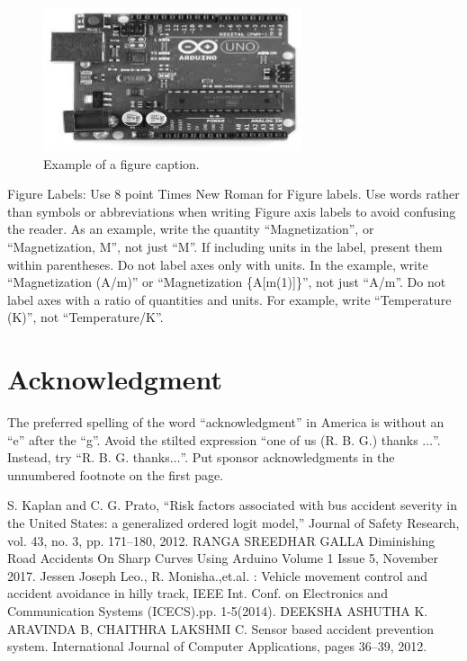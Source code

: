 \documentclass[conference]{IEEEtran}
\begin{document}
    \begin{figure}[htbp]
        \centerline{\includegraphics{arduiono-uno}}
        \caption{Example of a figure caption.}
        \label{fig}
    \end{figure}

    Figure Labels: Use 8 point Times New Roman for Figure labels. Use words
    rather than symbols or abbreviations when writing Figure axis labels to
    avoid confusing the reader. As an example, write the quantity
    ``Magnetization'', or ``Magnetization, M'', not just ``M''. If including
    units in the label, present them within parentheses. Do not label axes only
    with units. In the example, write ``Magnetization (A/m)'' or ``Magnetization
    \{A[m(1)]\}'', not just ``A/m''. Do not label axes with a ratio of
    quantities and units. For example, write ``Temperature (K)'', not
    ``Temperature/K''.

    \section*{Acknowledgment}

    The preferred spelling of the word ``acknowledgment'' in America is without
    an ``e'' after the ``g''. Avoid the stilted expression ``one of us (R. B.
    G.) thanks $\ldots$''. Instead, try ``R. B. G. thanks$\ldots$''. Put sponsor
    acknowledgments in the unnumbered footnote on the first page.


    \begin{thebibliography}{00}
         S. Kaplan and C. G. Prato, “Risk factors associated with bus accident severity in the United States: a generalized ordered logit model,” Journal of Safety
        Research, vol. 43, no. 3, pp. 171–180, 2012.
         RANGA SREEDHAR GALLA Diminishing Road Accidents On Sharp Curves Using Arduino Volume 1 Issue 5, November 2017.
         Jessen Joseph Leo., R. Monisha.,et.al. : Vehicle movement control and accident avoidance in hilly track, IEEE Int. Conf. on Electronics and Communication
        Systems (ICECS).pp. 1-5(2014).
         DEEKSHA ASHUTHA K. ARAVINDA B, CHAITHRA LAKSHMI C. Sensor based accident prevention system. International Journal of Computer
        Applications, pages 36–39, 2012.
        \end{thebibliography}
\end{document}
